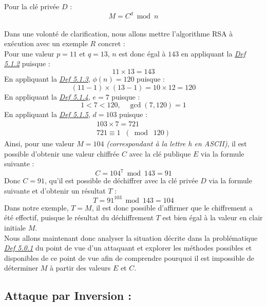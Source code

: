 \documentclass{article}
\begin{document}
Pour la clé privée \(D\) : \[ M = C^d \bmod n \] \\

Dans une volonté de clarification, nous allons mettre l'algorithme RSA à
exécution avec un exemple \(R\) concret : \\

Pour une valeur \(p = 11\) et \(q = 13\), \(n\) est donc égal à \(143\)
en appliquant la \textit{\hyperref[def-5.1.2]{Def 5.1.2}} puisque :
\[11 \times 13 = 143\]En appliquant la
\textit{\hyperref[def-5.1.3]{Def 5.1.3}}, \(\phi(n) = 120\) puisque :
\[  (11-1)\times (13-1) = 10 \times 12 = 120 \]En appliquant la
\textit{\hyperref[def-5.1.4]{Def 5.1.4}}, \(e = 7\) puisque :
\[ 1 < 7 < 120, \quad \gcd(7, 120) = 1 \]En appliquant la
\textit{\hyperref[def-5.1.5]{Def 5.1.5}}, \(d = 103\) puisque :
\[	\begin{array}{l}
	103 \times 7 = 721 \\
	721 \equiv 1 \;\; (\bmod \; 120)
\end{array}
\]
Ainsi, pour une valeur \(M = 104\) \textit{(correspondant à la lettre h en
	ASCII)}, il est possible d'obtenir une valeur chiffrée \(C\) avec la clé
publique \(E\) via la formule suivante :
\[C = 104^{7} \bmod 143 = 91 \]Donc \(C = 91\), qu'il est possible de
déchiffrer avec la clé privée \(D\) via la formule suivante et d'obtenir
un résultat \(T\) : \[T = 91^{103} \bmod 143 = 104 \] Dans notre exemple,
\(T=M\), il est donc possible d'affirmer que le chiffrement a été
effectif, puisque le résultat du déchiffrement \(T\) est bien égal à la
valeur en clair initiale \(M\). \\

Nous allons maintenant donc analyser la situation décrite dans la
problématique \textit{\hyperref[def-5.0.1]{Def 5.0.1}} du point de
vue d'un attaquant et explorer les méthodes possibles et disponibles de
ce point de vue afin de comprendre pourquoi il est impossible de
déterminer \(M\) à partir des valeurs \(E\) et \(C\).

\clearpage

\subsection{Attaque par Inversion :}\label{attaque-par-inversion}
\end{document}
